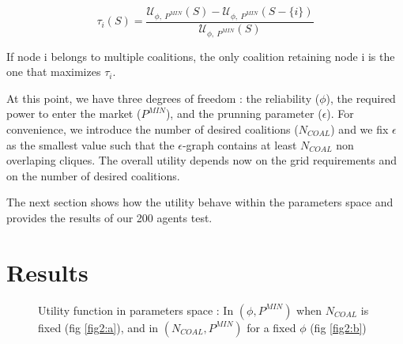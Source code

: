\documentclass[conference]{IEEEtran}
\begin{document}
\begin{equation}
\tau_{i}(S) = \dfrac{\mathcal{U}_{\phi,\ P^{MIN}}(S) - \mathcal{U}_{\phi,\ P^{MIN}}(S-\{i\}) }{\mathcal{U}_{\phi,\ P^{MIN}}(S)}
\label{tau}
\end{equation}

If node i belongs to  multiple coalitions, the only coalition retaining node i is the one that maximizes $ \tau_{i} $.

At this point, we have three degrees of freedom : the reliability ($ \phi $), the required power to enter the market ($P^{MIN}$), and the prunning parameter ($\epsilon$). For convenience, we introduce the number of desired coalitions ($ N_{COAL} $) and we fix $\epsilon $ as the smallest value such that the $ \epsilon $-graph contains at least $ N_{COAL} $ non overlaping cliques. The overall utility depends now on the grid requirements and on the number of desired coalitions.

The next section shows how the utility behave within the parameters space and provides the results of our 200 agents test.

\section{Results}
\label{sec:results}

\begin{figure}
 \centering
  \hspace{1em}%
\caption{Utility function in parameters space : In $ (\phi, P^{MIN}) $ when $ N_{COAL} $ is fixed (fig \ref{fig2:a}), and in $ (N_{COAL}, P^{MIN}) $ for a fixed $ \phi $ (fig \ref{fig2:b})}
\label{Fig2}
\end{figure}
\end{document}
